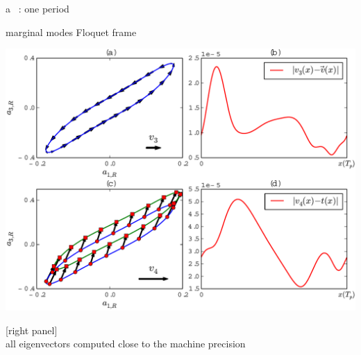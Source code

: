 \begin{frame}{a \rpo\ : one period}
\begin{block}{marginal modes Floquet frame}
\begin{center}
\includegraphics[width=1.0\textwidth]{../../xiong/figures/ppo1vectfield}
\end{center}
\end{block}
[right panel] \\
all eigenvectors computed close to the machine precision
\end{frame}

